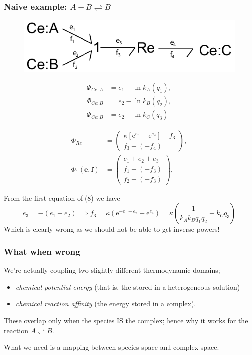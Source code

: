 \documentclass[10pt,reqno]{beamer}
\newcommand{\e}{\mathrm{e}}
\begin{document}
\begin{frame}
\frametitle{Naive example: $A+B\rightleftharpoons B$}
\begin{figure}
	\includegraphics[scale=0.8]{images/bondgraph_abc_naive}
\end{figure}
{\scriptsize
\begin{minipage}{0.475\linewidth}
\begin{align}
\Phi_{Ce:A} &= e_1 - \ln k_A(q_1),\\
\Phi_{Ce:B} &= e_2 - \ln k_B(q_2),\\
\Phi_{Ce:B} &= e_2 - \ln k_C(q_3)
\end{align}
\end{minipage}
\begin{minipage}{0.475\linewidth}
	\begin{align}
\Phi_{Re} &= \left(
\begin{matrix}
	\kappa\left[\e^{e_3} - \e^{e_4}\right] - f_3\\
	f_3 + (- f_4)
\end{matrix}
\right),\\
\Phi_1(\mathbf{e},\mathbf{f})&=\left(
\begin{matrix}
	e_1 + e_2 + e_3\\
	f_1 - (-f_3)\\
	f_2- (-f_3)\end{matrix}\right),
\end{align}
\end{minipage}	

From the first equation of (8) we have
\[
e_3 = -(e_1 + e_2) \implies f_3 = \kappa \left(\e^{ - e_1 - e_2} - \e^{e_4}\right) = \kappa\left(\frac{1}{k_A k_Bq_1 q_2} + k_Cq_3\right)
\]
Which is clearly wrong as we should not be able to get inverse powers!}
\end{frame}
\begin{frame}
\frametitle{What when wrong}
We're actually coupling two slightly different thermodynamic domains;
\begin{itemize}
	\item \emph{chemical potential energy} (that is, the stored in a heterogeneous solution)
	\item \emph{chemical reaction affinity} (the energy stored in a complex).
\end{itemize}

These overlap only when the species IS the complex; hence why it works for the reaction $A\rightleftharpoons B$.
\vspace{10pt}

What we need is a mapping between species space and complex space.

\end{frame}
\end{document}
